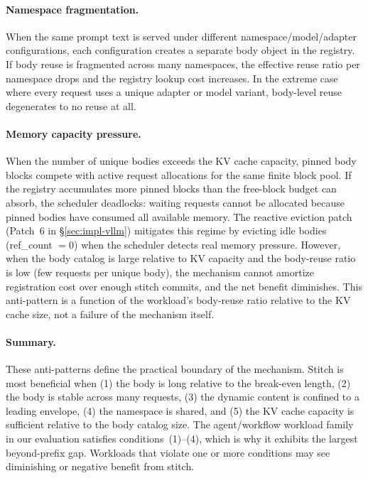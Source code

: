 \documentclass[conference]{IEEEtran}
\begin{document}
\paragraph{Namespace fragmentation.}
When the same prompt text is served under different namespace/model/adapter configurations, each configuration creates a separate body object in the registry. If body reuse is fragmented across many namespaces, the effective reuse ratio per namespace drops and the registry lookup cost increases. In the extreme case where every request uses a unique adapter or model variant, body-level reuse degenerates to no reuse at all.

\paragraph{Memory capacity pressure.}
When the number of unique bodies exceeds the KV cache capacity, pinned body blocks compete with active request allocations for the same finite block pool. If the registry accumulates more pinned blocks than the free-block budget can absorb, the scheduler deadlocks: waiting requests cannot be allocated because pinned bodies have consumed all available memory. The reactive eviction patch (Patch~6 in \S\ref{sec:impl-vllm}) mitigates this regime by evicting idle bodies (ref\_count $= 0$) when the scheduler detects real memory pressure. However, when the body catalog is large relative to KV capacity and the body-reuse ratio is low (few requests per unique body), the mechanism cannot amortize registration cost over enough stitch commits, and the net benefit diminishes. This anti-pattern is a function of the workload's body-reuse ratio relative to the KV cache size, not a failure of the mechanism itself.

\paragraph{Summary.}
These anti-patterns define the practical boundary of the mechanism. Stitch is most beneficial when (1) the body is long relative to the break-even length, (2) the body is stable across many requests, (3) the dynamic content is confined to a leading envelope, (4) the namespace is shared, and (5) the KV cache capacity is sufficient relative to the body catalog size. The agent/workflow workload family in our evaluation satisfies conditions~(1)--(4), which is why it exhibits the largest beyond-prefix gap. Workloads that violate one or more conditions may see diminishing or negative benefit from stitch.
\end{document}
